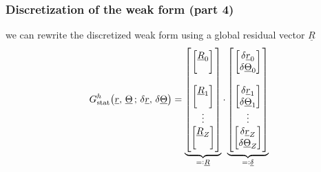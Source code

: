 \begin{frame}
  \frametitle{Discretization of the weak form (part 4)}

  we can rewrite the discretized weak form using a global residual vector $\underline{R}$
  \begin{displaymath}
    G_{\text{stat}}^h \bigl( \underline{r}, \, \underline{\Theta} \, ; \, \delta \underline{r}, \, \delta \underline{\Theta} \bigr) =
    \underbrace{
    \begin{bmatrix}
      \begin{bmatrix}
        \underline{R}_0 \\
        \null 
      \end{bmatrix}
      \\ \\
      \begin{bmatrix}
        \underline{R}_1 \\
        \null
      \end{bmatrix}
      \\
      \vdots
      \\
      \begin{bmatrix}
        \underline{R}_Z \\
        \null
      \end{bmatrix}
    \end{bmatrix}
    }_{=: \underline{R}}
    \cdot
    \underbrace{
    \begin{bmatrix}
      \begin{bmatrix}
        \delta \underline{r}_0 \\
        \delta \underline{\Theta}_0
      \end{bmatrix}
      \\ \\
      \begin{bmatrix}
        \delta \underline{r}_1 \\
        \delta \underline{\Theta}_1
      \end{bmatrix}
      \\
      \vdots
      \\
      \begin{bmatrix}
        \delta \underline{r}_Z \\
        \delta \underline{\Theta}_Z
      \end{bmatrix}
    \end{bmatrix}
    }_{=: \underline{\delta}}
  \end{displaymath}
  

\end{frame}
